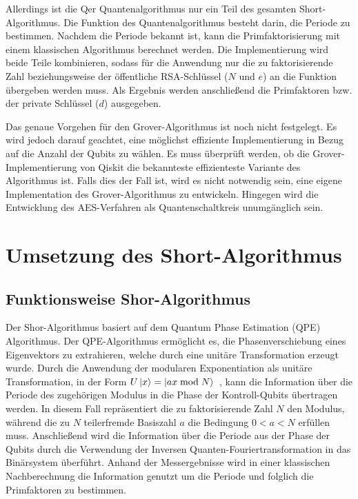 \documentclass[lettersize,journal]{IEEEtran}
\begin{document}
Allerdings ist die Qer Quantenalgorithmus nur ein Teil des gesamten Short-Algorithmus.
Die Funktion des Quantenalgorithmus besteht darin,
die Periode zu bestimmen.
Nachdem die Periode bekannt ist,
kann die Primfaktorisierung mit einem klassischen Algorithmus berechnet werden.
Die Implementierung wird beide Teile kombinieren,
sodass für die Anwendung nur die zu faktorisierende Zahl beziehungsweise
der öffentliche RSA-Schlüssel (\(N\) und \(e\)) an die Funktion übergeben werden muss.
Als Ergebnis werden anschließend die Primfaktoren bzw. der private Schlüssel (\(d\)) ausgegeben.

Das genaue Vorgehen für den Grover-Algorithmus ist noch nicht festgelegt.
Es wird jedoch darauf geachtet, eine möglichst effiziente Implementierung in Bezug auf die Anzahl der Qubits zu wählen.
Es muss überprüft werden, ob die Grover-Implementierung von Qiskit die bekannteste effizienteste Variante des Algorithmus ist.
Falls dies der Fall ist, wird es nicht notwendig sein,
eine eigene Implementation des Grover-Algorithmus zu entwickeln.
Hingegen wird die Entwicklung des AES-Verfahren als Quantenschaltkreis unumgänglich sein.

\section{Umsetzung des Short-Algorithmus}
\subsection{Funktionsweise Shor-Algorithmus}

Der Shor-Algorithmus basiert auf dem Quantum Phase Estimation (QPE) Algorithmus.
Der QPE-Algorithmus ermöglicht es, die Phasenverschiebung eines Eigenvektors zu extrahieren,
welche durch eine unitäre Transformation erzeugt wurde.
Durch die Anwendung der modularen Exponentiation als unitäre Transformation,
in der Form \(U\ket{x} = \ket{ax \bmod N}\)~\cite{IBM:Shor},
kann die Information über die Periode des zugehörigen Modulus in die Phase der Kontroll-Qubits übertragen werden.
In diesem Fall repräsentiert die zu faktorisierende Zahl \(N\) den Modulus,
während die zu \(N\) teilerfremde Basiszahl \(a\) die Bedingung \(0 < a < N\) erfüllen muss.
Anschließend wird die Information über die Periode aus der Phase der Qubits
durch die Verwendung der Inversen Quanten-Fouriertransformation in das Binärsystem überführt.
Anhand der Messergebnisse wird in einer klassischen Nachberechnung die Information genutzt
um die Periode und folglich die Primfaktoren zu bestimmen.
\end{document}
